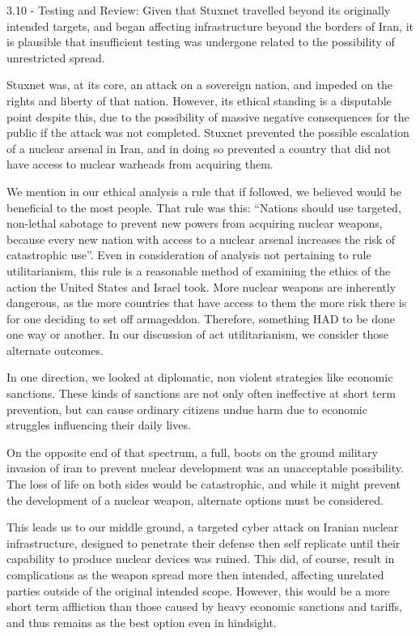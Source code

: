 3.10 - Testing and Review: Given that Stuxnet travelled beyond its originally intended targets, and began affecting infrastructure beyond the borders of Iran, it is plausible that insufficient testing was undergone related to the possibility of unrestricted spread.

Stuxnet was, at its core, an attack on a sovereign nation, and impeded on the rights and liberty of that nation. However, its ethical standing is a disputable point despite this, due to the possibility of massive negative consequences for the public if the attack was not completed. Stuxnet prevented the possible escalation of a nuclear arsenal in Iran, and in doing so prevented a country that did not have access to nuclear warheads from acquiring them.

We mention in our ethical analysis a rule that if followed, we believed would be beneficial to the most people. That rule was this: “Nations should use targeted, non-lethal sabotage to prevent new powers from acquiring nuclear weapons, because every new nation with access to a nuclear arsenal increases the risk of catastrophic use”. Even in consideration of analysis not pertaining to rule utilitarianism, this rule is a reasonable method of examining the ethics of the action the United States and Israel took. More nuclear weapons are inherently dangerous, as the more countries that have access to them the more risk there is for one deciding to set off armageddon. Therefore, something HAD to be done one way or another. In our discussion of act utilitarianism, we consider those alternate outcomes.

In one direction, we looked at diplomatic, non violent strategies like economic sanctions. These kinds of sanctions are not only often ineffective at short term prevention, but can cause ordinary citizens undue harm due to economic struggles influencing their daily lives.

On the opposite end of that spectrum, a full, boots on the ground military invasion of iran to prevent nuclear development was an unacceptable possibility. The loss of life on both sides would be catastrophic, and while it might prevent the development of a nuclear weapon, alternate options must be considered.

This leads us to our middle ground, a targeted cyber attack on Iranian nuclear infrastructure, designed to penetrate their defense then self replicate until their capability to produce nuclear devices was ruined. This did, of course, result in complications as the weapon spread more then intended, affecting unrelated parties outside of the original intended scope. However, this would be a more short term affliction than those caused by heavy economic sanctions and tariffs, and thus remains as the best option even in hindsight.

